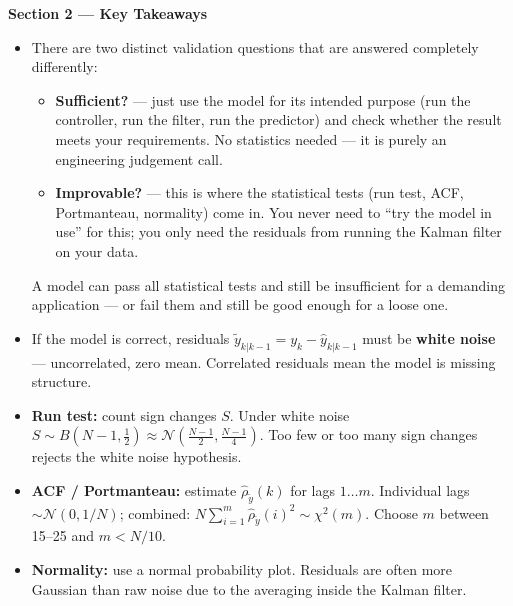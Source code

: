 \documentclass[12pt, a4paper]{article}
\begin{document}
\begin{keybox}
  \textbf{Section 2 --- Key Takeaways}
  \begin{itemize}[leftmargin=1.2em, itemsep=2pt]
    \item There are two distinct validation questions that are answered
      completely differently:
      \begin{itemize}[leftmargin=1.2em, itemsep=1pt]
        \item \textbf{Sufficient?} --- just use the model for its intended
          purpose (run the controller, run the filter, run the predictor)
          and check whether the result meets your requirements.
          No statistics needed --- it is purely an engineering judgement
          call.
        \item \textbf{Improvable?} --- this is where the statistical tests
          (run test, ACF, Portmanteau, normality) come in.
          You never need to ``try the model in use'' for this; you only
          need the residuals from running the Kalman filter on your data.
      \end{itemize}
      A model can pass all statistical tests and still be insufficient for
      a demanding application --- or fail them and still be good enough for
      a loose one.
    \item If the model is correct, residuals $\tilde{y}_{k|k-1} = y_k -
      \hat{y}_{k|k-1}$ must be \textbf{white noise} --- uncorrelated,
      zero mean.
      Correlated residuals mean the model is missing structure.
    \item \textbf{Run test:} count sign changes $S$.
      Under white noise $S \sim B(N{-}1, \tfrac{1}{2}) \approx
      \mathcal{N}\!\left(\tfrac{N-1}{2}, \tfrac{N-1}{4}\right)$.
      Too few or too many sign changes rejects the white noise hypothesis.
    \item \textbf{ACF / Portmanteau:} estimate $\hat{\rho}_{\tilde{y}}(k)$
      for lags $1\ldots m$.
      Individual lags $\sim \mathcal{N}(0, 1/N)$; combined:
      $N\sum_{i=1}^m \hat{\rho}_{\tilde{y}}(i)^2 \sim \chi^2(m)$.
      Choose $m$ between 15--25 and $m < N/10$.
    \item \textbf{Normality:} use a normal probability plot.
      Residuals are often more Gaussian than raw noise due to the averaging
      inside the Kalman filter.
  \end{itemize}
\end{keybox}
\end{document}
